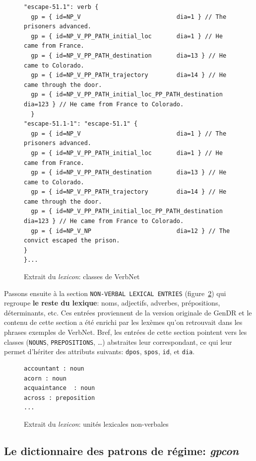 \begin{figure}[htb]
\begin{lstlisting}[language=mate]
"escape-51.1": verb {
  gp = { id=NP_V                           dia=1 } // The prisoners advanced.
  gp = { id=NP_V_PP_PATH_initial_loc       dia=1 } // He came from France.
  gp = { id=NP_V_PP_PATH_destination       dia=13 } // He came to Colorado.
  gp = { id=NP_V_PP_PATH_trajectory        dia=14 } // He came through the door.
  gp = { id=NP_V_PP_PATH_initial_loc_PP_PATH_destination dia=123 } // He came from France to Colorado.
  }
"escape-51.1-1": "escape-51.1" {
  gp = { id=NP_V                           dia=1 } // The prisoners advanced.
  gp = { id=NP_V_PP_PATH_initial_loc       dia=1 } // He came from France.
  gp = { id=NP_V_PP_PATH_destination       dia=13 } // He came to Colorado.
  gp = { id=NP_V_PP_PATH_trajectory        dia=14 } // He came through the door.
  gp = { id=NP_V_PP_PATH_initial_loc_PP_PATH_destination dia=123 } // He came from France to Colorado.
  gp = { id=NP_V_NP                        dia=12 } // The convict escaped the prison.
}
}...
\end{lstlisting}
  \caption{Extrait du \emph{lexicon}: classes de VerbNet}
	\label{fig:vnclass}
\end{figure}

Passons ensuite à la section \texttt{NON-VERBAL LEXICAL ENTRIES} (figure~\ref{fig:unitenonverbale}) qui regroupe \textbf{le reste du lexique}: noms, adjectifs, adverbes, prépositions, déterminants, etc. Ces entrées proviennent de la version originale de GenDR \citep{lareau18} et le contenu de cette section a été enrichi par les lexèmes qu'on retrouvait dans les phrases exemples de VerbNet. Bref, les entrées de cette section pointent vers les classes (\texttt{NOUNS}, \texttt{PREPOSITIONS}, \ldots) abstraites leur correspondant, ce qui leur permet d'hériter des attributs suivants: \texttt{dpos}, \texttt{spos}, \texttt{id}, et \texttt{dia}.

\begin{figure}[htb]
\begin{lstlisting}[language=mate]
accountant : noun
acorn : noun
acquaintance  : noun
across : preposition
...
\end{lstlisting}
  \caption{Extrait du \emph{lexicon}: unités lexicales non-verbales}
	\label{fig:unitenonverbale}
\end{figure}

\subsection{Le dictionnaire des patrons de régime: \emph{gpcon}}

